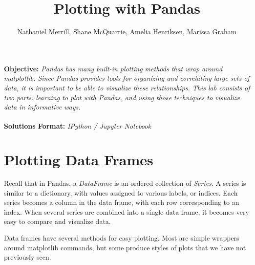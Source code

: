 \documentclass[12pt]{article}
\begin{document}
\title{Plotting with Pandas}
\author{Nathaniel Merrill, Shane McQuarrie, Amelia Henriksen, Marissa Graham}
\maketitle

\noindent \textbf{Objective:}
\emph{Pandas has many built-in plotting methods that wrap around matplotlib. Since Pandas provides tools for organizing and correlating large sets of data, it is important to be able to visualize these relationships. This lab consists of two parts: learning to plot with Pandas, and using those techniques to visualize data in informative ways.}
\\
\\
\noindent \textbf{Solutions Format:} \emph{IPython / Jupyter Notebook}

\section*{Plotting Data Frames}


Recall that in Pandas, a \emph{DataFrame} is an ordered collection of \emph{Series}.
A series is similar to a dictionary, with values assigned to various labels, or indices. Each series becomes a column in the data frame, with each row corresponding to an index.
When several series are combined into a single data frame, it becomes very easy to compare and visualize data.


Data frames have several methods for easy plotting.
Most are simple wrappers around matplotlib commands, but some produce styles of plots that we have not previously seen.



\end{document}
